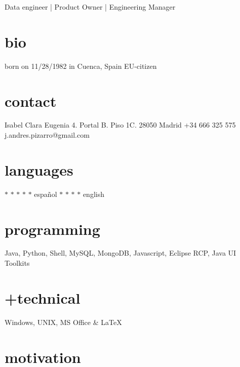 \documentclass[]{friggeri-cv}
\begin{document}
       {Data engineer | Product Owner | Engineering Manager}



\begin{aside} %
  \section{bio}
  born on 11/28/1982
  in Cuenca, Spain
  EU-citizen
  \section{contact}
  Isabel Clara Eugenia 4. 
  Portal B. Piso 1C.
  28050 Madrid
  +34 666 325 575
  j.andres.pizarro@gmail.com
  \section{languages}
  {\color{lightgray} $\ast$}{\color{lightgray} $\ast$}{\color{lightgray} $\ast$}{\color{lightgray} $\ast$}{\color{lightgray} $\ast$} español
  {\color{lightgray} $\ast$}{\color{lightgray} $\ast$}{\color{lightgray} $\ast$}{\color{lightgray} $\ast$} english
  \section{programming}
  Java, Python, Shell,
  MySQL, MongoDB, Javascript,
  Eclipse RCP, Java UI Toolkits
  \section{ +technical}
  Windows, UNIX,
  MS Office \& \LaTeX
\end{aside}


\section{motivation}
\end{document}
